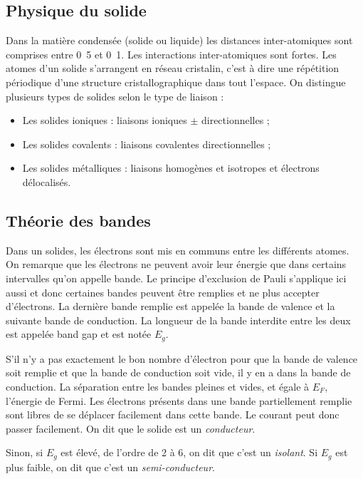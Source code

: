 \subsection{Physique du solide}
Dans la matière condensée (solide ou liquide)
les distances inter-atomiques sont comprises entre
\unit{0.5}{\nano\meter} et \unit{0.1}{\nano\meter}.
Les interactions inter-atomiques sont fortes.
Les atomes d'un solide s'arrangent en réseau cristalin,
c'est à dire une répétition périodique d'une structure
cristallographique dans tout l'espace.
On distingue plusieurs types de solides selon
le type de liaison :
\begin{itemize}
	\item Les solides ioniques : liaisons ioniques $\pm$
	directionnelles ;
	\item Les solides covalents : liaisons covalentes
	directionnelles ;
	\item Les solides métalliques : liaisons homogènes
	et isotropes et électrons délocalisés.
\end{itemize}


\subsection{Théorie des bandes}
Dans un solides,
les électrons sont mis en communs entre les différents atomes.
On remarque que les électrons ne peuvent avoir leur énergie que dans certains
intervalles qu'on appelle bande.
Le principe d'exclusion de Pauli s'applique ici aussi et donc certaines
bandes peuvent être remplies et ne plus accepter d'électrons.
La dernière bande remplie est appelée la bande de valence et la suivante
bande de conduction.
La longueur de la bande interdite entre les deux est appelée
band gap et est notée $E_g$.

S'il n'y a pas exactement le bon nombre d'électron pour
que la bande de valence soit remplie et que la bande de conduction soit
vide, il y en a dans la bande de conduction.
La séparation entre les bandes pleines et vides, et égale à $E_F$,
l'énergie de Fermi.
Les électrons présents dans une bande partiellement remplie sont libres de se
déplacer facilement dans cette bande. Le courant peut donc passer facilement.
On dit que le solide est un \emph{conducteur}.

Sinon, si $E_g$ est élevé, de l'ordre de 2 à \si{6}{\electronvolt},
on dit que c'est un \emph{isolant}.
Si $E_g$ est plus faible, on dit que c'est un \emph{semi-conducteur}.

